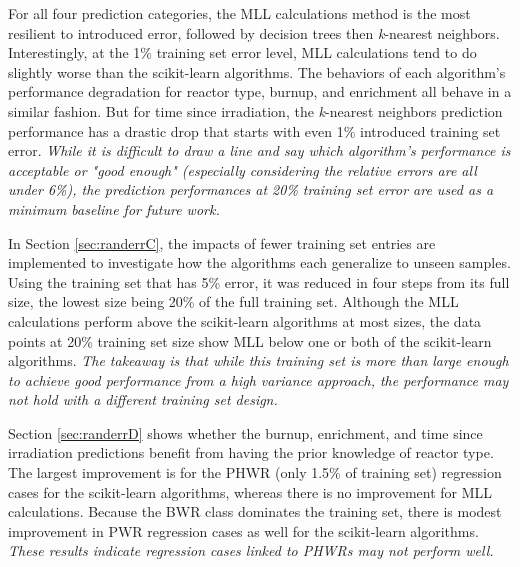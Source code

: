 For all four prediction categories, the \gls{MLL} calculations method is the
most resilient to introduced error, followed by decision trees then
\textit{k}-nearest neighbors. Interestingly, at the 1\% training set error
level, \gls{MLL} calculations tend to do slightly worse than the scikit-learn
algorithms.  The behaviors of each algorithm's performance degradation for
reactor type, burnup, and enrichment all behave in a similar fashion. But for
time since irradiation, the \textit{k}-nearest neighbors prediction performance
has a drastic drop that starts with even 1\% introduced training set error.
\textit{While it is difficult to draw a line and say which algorithm's
performance is acceptable or "good enough" (especially considering the relative
errors are all under 6\%), the prediction performances at 20\% training set
error are used as a minimum baseline for future work.}

In Section \ref{sec:randerrC}, the impacts of fewer training set entries are
implemented to investigate how the algorithms each generalize to unseen
samples. Using the training set that has 5\% error, it was reduced in four
steps from its full size, the lowest size being 20\% of the full training set.
Although the \gls{MLL} calculations perform above the scikit-learn algorithms
at most sizes, the data points at 20\% training set size show \gls{MLL} below
one or both of the scikit-learn algorithms. \textit{The takeaway is that while
this training set is more than large enough to achieve good performance from a
high variance approach, the performance may not hold with a different training
set design.}

Section \ref{sec:randerrD} shows whether the burnup, enrichment, and time since
irradiation predictions benefit from having the prior knowledge of reactor
type.  The largest improvement is for the \gls{PHWR} (only 1.5\% of training
set) regression cases for the scikit-learn algorithms, whereas there is no
improvement for \gls{MLL} calculations. Because the \gls{BWR} class dominates
the training set, there is modest improvement in \gls{PWR} regression cases as
well for the scikit-learn algorithms. \textit{These results indicate regression
cases linked to \gls{PHWR}s may not perform well.} 

